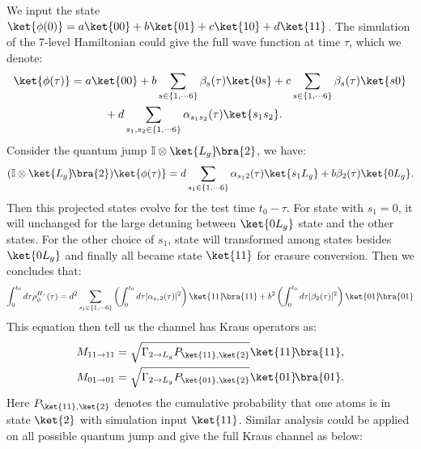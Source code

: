 \documentclass[11pt]{article}
\begin{document}
We input the state $\ket{\phi(0)} = a\ket{00} + b\ket{01} + c\ket{10} + d \ket{11}$. The simulation of the 7-level Hamiltonian could give the full wave function at time $\tau$, which we denote:
\begin{align}
    \ket{\phi(\tau)} &=a\ket{00} + b \sum_{s \in \{1,\cdots 6\}} \beta_{s}(\tau) \ket{0 s} + c \sum_{s \in \{1,\cdots 6\}} \beta_{s}(\tau) \ket{ s0} \notag  \\
   &\quad\quad\quad  + d \sum_{s_1,s_2 \in \{1,\cdots 6\}} \alpha_{s_1 s_2}(\tau) \ket{s_1 s_2} .
\end{align}
Consider the quantum jump $\mathbb{I} \otimes \ket{L_g}\!\bra{2}$, we have:
\begin{align}
  (\mathbb{I} \otimes  \ket{L_g}\!\bra{2})\ket{\phi(\tau)} = d\sum_{s_1\in \{1,\cdots 6\}} \alpha_{s_1 2}(\tau) \ket{s_1 L_g} + b  \beta_{2}(\tau) \ket{0 L_g}.
\end{align}
Then this projected states evolve for the test time $t_0 - \tau$. For state with $s_1 = 0$, it will unchanged for the large detuning between $\ket{0L_g}$ state and the other states. For the other choice of $s_1$, state will transformed among states besides $\ket{0L_g}$ and finally all became state $\ket{11}$ for erasure conversion. Then we concludes that:
\begin{align*}
    \int_0^{t_0} d\tau \rho_{\phi}^{H_\tau}(\tau) =d^2 \sum_{s_1\in \{1,\cdots 6\}}  \left(\int_0^{t_0} d\tau |\alpha_{s_1 2}(\tau) |^2 \right)\ket{11}\!\bra{11} + b^2  \left(\int_0^{t_0} d\tau |\beta_2(\tau)|^2 \right)\ket{01}\!\bra{01}
\end{align*}
This equation then tell us the channel has Kraus operators as:
\begin{align}
    M_{11 \to 11} &=\sqrt{\Gamma_{2 \to L_g} P_{\ket{11},\ket{2}}}\ket{11}\!\bra{11},\\
     M_{01 \to 01} &=\sqrt{\Gamma_{2 \to L_g} P_{\ket{01},\ket{2}}}\ket{01}\!\bra{01}.
\end{align}
Here $P_{\ket{11},\ket{2}}$ denotes the cumulative probability that one atoms is in state $\ket{2}$ with simulation input $\ket{11}$. Similar analysis could be applied on all possible quantum jump and give the full Kraus channel as below:
\end{document}
